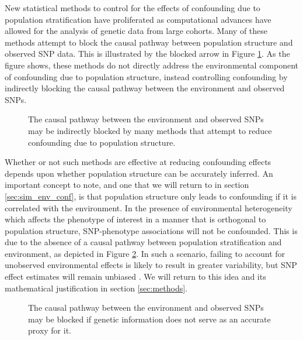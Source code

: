 New statistical methods to control for the effects of confounding due to population stratification have proliferated as computational advances have allowed for the analysis of genetic data from large cohorts. Many of these methods attempt to block the causal pathway between population structure and observed SNP data. This is illustrated by the blocked arrow in Figure \ref{fig:ps_env_block}. As the figure shows, these methods do not directly address the environmental component of confounding due to population structure, instead controlling confounding by indirectly blocking the causal pathway between the environment and observed SNPs. 

\begin{figure}[H]
\centering
{}
\caption{The causal pathway between the environment and observed SNPs may be indirectly blocked by many methods that attempt to reduce confounding due to population structure.}
\label{fig:ps_env_block}
\end{figure}

Whether or not such methods are effective at reducing confounding effects depends upon whether population structure can be accurately inferred. An important concept to note, and one that we will return to in section \ref{sec:sim_env_conf}, is that population structure only leads to confounding if it is correlated with the environment.
In the presence of environmental heterogeneity which affects the phenotype of interest in a manner that is orthogonal to population structure, SNP-phenotype associations will not be confounded. This is due to the absence of a causal pathway between population stratification and environment, as depicted in Figure \ref{fig:ps_env_block2}. In such a scenario, failing to account for unobserved environmental effects is likely to result in greater variability, but SNP effect estimates will remain unbiased \citep{greenland1999causal}. We will return to this idea and its mathematical justification in section \ref{sec:methods}. 

\begin{figure}[H]
\centering
{}
\caption{The causal pathway between the environment and observed SNPs may be blocked if genetic information does not serve as an accurate proxy for it.}
\label{fig:ps_env_block2}
\end{figure}

